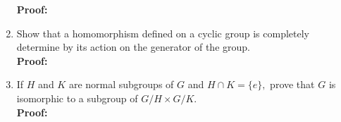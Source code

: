 \documentclass[12pt]{article}
\begin{document}
\begin{enumerate}
\textbf{Proof:}
	\vfill
\newpage
\item Show that a homomorphism defined on a cyclic group is completely determine by its action on the generator of the group. \\

\textbf{Proof:}
	\vfill
\item If $H$ and $K$ are normal subgroups of $G$ and $H \cap K=\{e\},$ prove that $G$ is isomorphic to a subgroup of $G/H \times G/K.$\\

\textbf{Proof:}
	\vfill

\end{enumerate}
\end{document}
